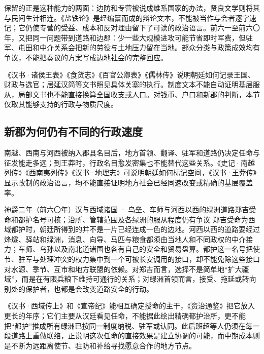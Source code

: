 保留的正是这种能力的两面：边防和专营被说成维系国家的办法，贤良文学则将其与民间生计相连。《盐铁论》是经编纂而成的辩论文本，不能被当作与会者逐字速记；它仍使专营的受益、成本和反对理由留下了可读的政治语言。前六一至前六〇年，又把同一问题带到道路和边郡：少一些大规模进攻可能节省即时军费，但驻军、屯田和中介关系会把新的劳役与土地压力留在当地。部众分类与政策成效均有争议，不能把奏议的方案写成边地社会的完整回应。

\begin{sourcenote}[制度材料的尺度]
《汉书·诸侯王表》《食货志》《百官公卿表》《儒林传》说明朝廷如何记录王国、财政与选官；居延汉简等文书照见具体关塞的执行。制度文本不能自动证明基层服从，局部文书也不能直接换算全国收支或人口。对钱币、户口和新郡的判断，本节仅取其能够支持的行政与物质尺度。
\end{sourcenote}
\subsection{新郡为何仍有不同的行政速度}

南越、西南与河西被纳入郡县名目后，地方首领、翻译、驻军和道路仍决定任命与征发能走多远；到王莽时，行政名目愈发密集也不能替代这些关系。《史记·南越列传》《西南夷列传》《汉书·地理志》可说明朝廷如何标记空间，《汉书·王莽传》显示改制的政治语言，均不能直接证明地方社会已经同速改变或精确的基层覆盖率。

\begin{event}{}{神爵二年（前六〇年）}{汉与西域诸国 · 乌垒、车师与河西以西的绿洲道路}{郑吉受命和都护名号可核；治所、管辖范围及各绿洲的服从程度仍有争议}
郑吉受命为西域都护时，朝廷所得到的并不是一片已经连成一色的边地。河西以西的道路要经过烽燧、驿站和绿洲，消息、向导、马匹与粮食都须由当地人和不同政权的中介接力；车师、乌孙以及南北道诸国也各有自己的安全和贸易盘算。都护这一名号把使节、驻军与处理冲突的权力集中到一个可被长安调用的接口，却不能免除这些接口对水源、季节、互市和地方联盟的依赖。对郑吉而言，选择不是简单地“扩大疆域”，而是在有限兵粮下维持可通行的关系；对绿洲首领而言，接受、拖延或转向别处的保护者，也都是会改变道路安全的行动。

《汉书·西域传上》和《宣帝纪》能相互确定授命的主干，《资治通鉴》把它放入更长的年序；它们主要从汉廷看见任命，不能据此绘出精确都护治所，更不能把“都护”推成所有绿洲已按同一制度纳税、驻军或认同。此后班超等人仍须在每一段道路上重做联络，正说明这次任命的直接效果是建立协调的可能，而中期成本则是不断为远距离使节、驻防和补给寻找愿意合作的地方节点。
\end{event}

